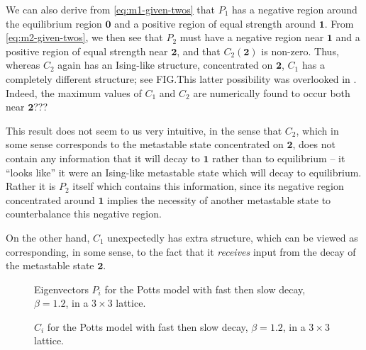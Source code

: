 \documentclass[10pt]{article}
\newcommand{\zeros}{\mathbf{0}}
\newcommand{\ones}{\mathbf{1}}
\newcommand{\twos}{\mathbf{2}}
\begin{document}
We can also derive from \eqref{eq:m1-given-twos} that $P_1$ has a negative
region around the equilibrium region $\zeros$ and a positive region
of equal strength around $\ones$.  From \eqref{eq:m2-given-twos}, we then see that $P_2$ must
have a negative region near $\ones$ and a positive region of equal strength near
$\twos$, and that $C_2(\twos)$ is non-zero.  Thus, whereas $C_2$
again has an Ising-like structure, concentrated on $\twos$,
$C_1$ has a completely different structure; see FIG.This
latter
possibility was overlooked in
\cite{LarraldeLeyvrazSandersJStatMech2006}.
Indeed, the maximum values of $C_1$ and $C_2$ are numerically found to occur both near $\twos$???  

This result does not seem to us very intuitive, in the sense that $C_2$, which
in some
sense corresponds to the metastable state concentrated on $\twos$, does not
contain any information that it will decay to $\ones$ rather than to
equilibrium -- 
it ``looks like'' it were an Ising-like metastable state which will
decay to equilibrium.  
Rather it is $P_2$ itself which contains this information, since its negative
region concentrated around $\ones$ implies the necessity of another
metastable state to counterbalance this negative region.  

On the other hand, $C_1$ unexpectedly has extra structure, which can be viewed as corresponding, in some
sense, to the fact that it  \emph{receives} input from the decay of the
metastable state $\twos$.




 \begin{figure}[htb]
\caption{Eigenvectors $P_i$ for the Potts model with fast then slow decay, $\beta=1.2$, in a $3 \times 3$ lattice.}
\label{fig:potts-fast-slow-P}
\end{figure}

 \begin{figure}[htb]
\caption{$C_i$ for the Potts model with fast then slow decay, $\beta=1.2$, in a $3 \times 3$ lattice.}
\label{fig:potts-fast-slow-C}
\end{figure}
\end{document}
